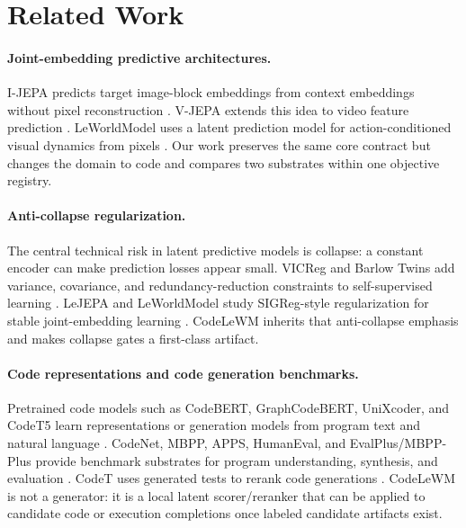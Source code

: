 \documentclass[11pt]{article}
\newcommand{\modelname}{CodeLeWM}
\begin{document}
\section{Related Work}

\paragraph{Joint-embedding predictive architectures.}
I-JEPA predicts target image-block embeddings from context embeddings without
pixel reconstruction \citep{assran2023selfsupervisedlearningimagesjointembedding}.
V-JEPA extends this idea to video feature prediction
\citep{bardes2024revisitingfeaturepredictionlearning}. LeWorldModel uses a
latent prediction model for action-conditioned visual dynamics from pixels
\citep{maes2026leworldmodelstableendtoendjointembedding}. Our work preserves
the same core contract but changes the domain to code and compares two
substrates within one objective registry.

\paragraph{Anti-collapse regularization.}
The central technical risk in latent predictive models is collapse: a constant
encoder can make prediction losses appear small. VICReg and Barlow Twins add
variance, covariance, and redundancy-reduction constraints to self-supervised
learning \citep{bardes2022vicregvarianceinvariancecovarianceregularizationselfsupervised,zbontar2021barlowtwinsselfsupervisedlearning}.
LeJEPA and LeWorldModel study SIGReg-style regularization for stable
joint-embedding learning \citep{balestriero2025lejepaprovablescalableselfsupervised,maes2026leworldmodelstableendtoendjointembedding}.
\modelname{} inherits that anti-collapse emphasis and makes collapse gates a
first-class artifact.

\paragraph{Code representations and code generation benchmarks.}
Pretrained code models such as CodeBERT, GraphCodeBERT, UniXcoder, and CodeT5
learn representations or generation models from program text and natural
language \citep{feng2020codebertpretrainedmodelprogramming,guo2021graphcodebertpretrainingcoderepresentations,guo2022unixcoderunifiedcrossmodalpretraining,wang2021codet5identifierawareunifiedpretrained}.
CodeNet, MBPP, APPS, HumanEval, and EvalPlus/MBPP-Plus provide benchmark
substrates for program understanding, synthesis, and evaluation
\citep{puri2021codenetlargescaleaicode,austin2021programsynthesislargelanguage,hendrycks2021measuringcodingchallengecompetence,chen2021evaluatinglargelanguagemodels,liu2023codegeneratedchatgptreally}.
CodeT uses generated tests to rerank code generations
\citep{chen2022codetcodegenerationgenerated}. \modelname{} is not a generator:
it is a local latent scorer/reranker that can be applied to candidate code or
execution completions once labeled candidate artifacts exist.
\end{document}
